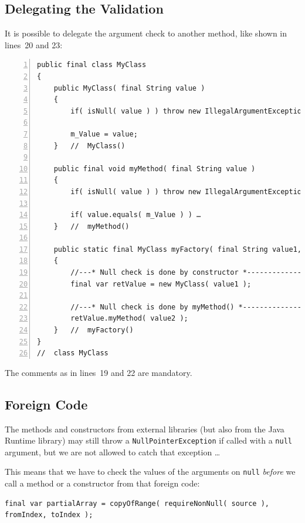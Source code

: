 \documentclass[11pt,a4paper, titlepage, parskip=half, headsepline, footsepline, cleardoublepage=current, headheight=1cm]{scrbook}
\begin{document}

\subsection{Delegating the Validation}
It is possible to delegate the argument check to another method, like shown in lines~20 and 23:
\begin{lstlisting}[numbers=left]
public final class MyClass
{
    public MyClass( final String value )
    {
        if( isNull( value ) ) throw new IllegalArgumentException( "value is null" );
        
        m_Value = value;
    }   //  MyClass()
    
    public final void myMethod( final String value )
    {
        if( isNull( value ) ) throw new IllegalArgumentException( "value is null" );
        
        if( value.equals( m_Value ) ) …
    }   //  myMethod()
    
    public static final MyClass myFactory( final String value1, final String value2 )
    {
    	//---* Null check is done by constructor *----------------------
    	final var retValue = new MyClass( value1 );
    	
    	//---* Null check is done by myMethod() *-----------------------
    	retValue.myMethod( value2 );
    }   //  myFactory()
}
//  class MyClass
\end{lstlisting}
The comments as in lines~19 and 22 are mandatory.

\subsection{Foreign Code}\label{sec:ForeignCode}
The methods and constructors from external libraries (but also from the Java Runtime library) may still throw a \lstinline|NullPointerException| if called with a \lstinline|null| argument, but we are not allowed to catch that exception …

This means that we have to check the values of the arguments on \lstinline|null| \textit{before} we call a method or a constructor from that foreign code:
\begin{lstlisting}
final var partialArray = copyOfRange( requireNonNull( source ), fromIndex, toIndex );
\end{lstlisting}
\end{document}
